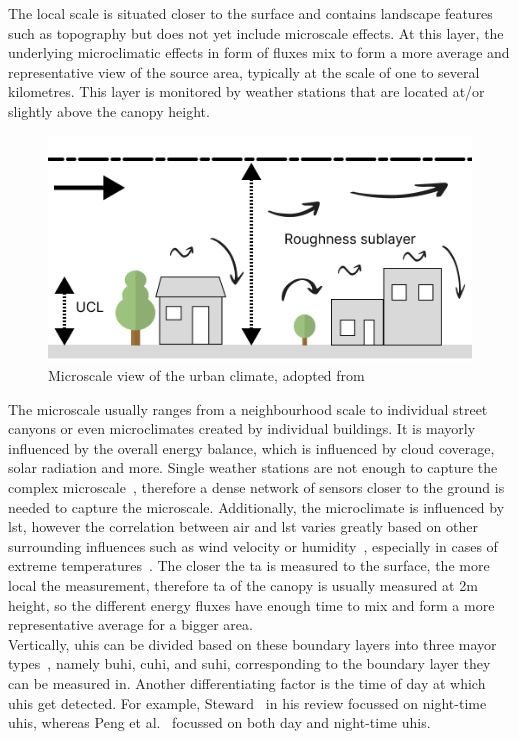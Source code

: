 The local scale is situated closer to the surface and contains landscape features such as topography but does not yet include microscale effects. At this layer, the underlying microclimatic effects in form of fluxes mix to form a more average and representative view of the source area, typically at the scale of one to several kilometres. This layer is monitored by weather stations that are located at/or slightly above the canopy height.

\begin{figure}[h]
    \centering
    \includegraphics[width=\textwidth]{images/microscale boundary layer.png}
    \caption{Microscale view of the urban climate, adopted from~\cite{oke2006guideline}}
    \label{fig:microscale boundary layer}
\end{figure}

The microscale usually ranges from a neighbourhood scale to individual street canyons or even microclimates created by individual buildings. It is mayorly influenced by the overall energy balance, which is influenced by cloud coverage, solar radiation and more. Single weather stations are not enough to capture the complex microscale~\cite{oke2004siting}, therefore a dense network of sensors closer to the ground is needed to capture the microscale. Additionally, the microclimate is influenced by \gls{lst}, however the correlation between air and \gls{lst} varies greatly based on other surrounding influences such as wind velocity or humidity~\cite{stoll1992surface}, especially in cases of extreme temperatures~\cite{good2016situ}. The closer the \gls{ta} is measured to the surface, the more local the measurement, therefore \gls{ta} of the canopy is usually measured at 2m height, so the different energy fluxes have enough time to mix and form a more representative average for a bigger area.\\
Vertically, \gls{uhi}s can be divided based on these boundary layers into three mayor types~\cite{oke1976distinction, oke2017urban}, namely \gls{buhi}, \gls{cuhi}, and \gls{suhi}, corresponding to the boundary layer they can be measured in. Another differentiating factor is the time of day at which \gls{uhi}s get detected. For example, Steward~\cite{stewart2011systematic} in his review focussed on night-time \gls{uhi}s, whereas Peng et al.~\cite{peng2012surface} focussed on both day and night-time \gls{uhi}s.

